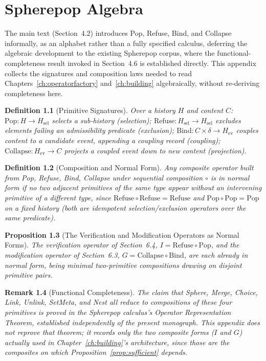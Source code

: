 \documentclass[11pt]{book}
\newtheorem{definition}{Definition}[chapter]
\newtheorem{proposition}[definition]{Proposition}
\newtheorem{remark}[definition]{Remark}
\begin{document}
\chapter{Spherepop Algebra}
\label{app:spherepop}

The main text (Section~4.2) introduces Pop, Refuse, Bind, and Collapse informally, as an alphabet rather than a fully specified calculus, deferring the algebraic development to the existing Spherepop corpus, where the functional-completeness result invoked in Section~4.6 is established directly. This appendix collects the signatures and composition laws needed to read Chapters~\ref{ch:operatorfactory} and~\ref{ch:building} algebraically, without re-deriving completeness here.

\begin{definition}[Primitive Signatures]
Over a history $H$ and content $C$: $\mathrm{Pop}: H \to H_{\mathrm{sel}}$ selects a sub-history (selection); $\mathrm{Refuse}: H_{\mathrm{sel}} \to H_{\mathrm{sel}}$ excludes elements failing an admissibility predicate (exclusion); $\mathrm{Bind}: C\times \delta \to H_{\mathrm{ev}}$ couples content to a candidate event, appending a coupling record (coupling); $\mathrm{Collapse}: H_{\mathrm{ev}} \to C$ projects a coupled event down to new content (projection).
\end{definition}

\begin{definition}[Composition and Normal Form]
Any composite operator built from Pop, Refuse, Bind, Collapse under sequential composition $\circ$ is in \emph{normal form} if no two adjacent primitives of the same type appear without an intervening primitive of a different type, since $\mathrm{Refuse}\circ\mathrm{Refuse} = \mathrm{Refuse}$ and $\mathrm{Pop}\circ\mathrm{Pop}=\mathrm{Pop}$ on a fixed history (both are idempotent selection/exclusion operators over the same predicate).
\end{definition}

\begin{proposition}[The Verification and Modification Operators as Normal Forms]
The verification operator of Section~6.4, $I=\mathrm{Refuse}\circ\mathrm{Pop}$, and the modification operator of Section~6.3, $G=\mathrm{Collapse}\circ\mathrm{Bind}$, are each already in normal form, being minimal two-primitive compositions drawing on disjoint primitive pairs.
\end{proposition}

\begin{remark}[Functional Completeness]
The claim that Sphere, Merge, Choice, Link, Unlink, SetMeta, and Nest all reduce to compositions of these four primitives is proved in the Spherepop calculus's Operator Representation Theorem, established independently of the present monograph. This appendix does not reprove that theorem; it records only the two composite forms ($I$ and $G$) actually used in Chapter~\ref{ch:building}'s architecture, since those are the composites on which Proposition~\ref{prop:sufficient} depends.
\end{remark}
\end{document}

